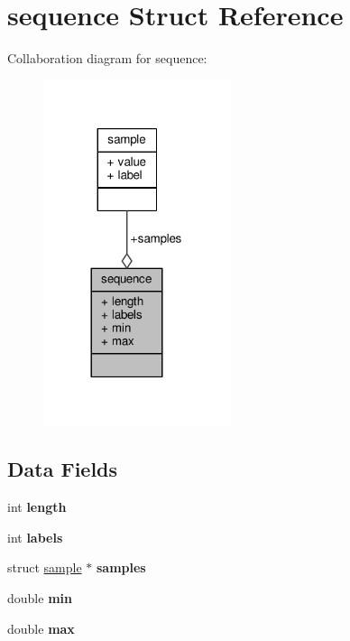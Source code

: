 \hypertarget{structsequence}{}\section{sequence Struct Reference}
\label{structsequence}


Collaboration diagram for sequence\+:\nopagebreak
\begin{figure}[H]
\begin{center}
\leavevmode
\includegraphics[width=156pt]{structsequence__coll__graph}
\end{center}
\end{figure}
\subsection*{Data Fields}
\begin{DoxyCompactItemize}
\item 
\mbox{\label{structsequence_ad17da18a2bb3da07590029e824e20552}} 
int {\bfseries length}
\item 
\mbox{\label{structsequence_a41a7f8a23509c97d200f1bfeb0e80743}} 
int {\bfseries labels}
\item 
\mbox{\label{structsequence_a61d88e23d15a3da29992b8dcf91ac186}} 
struct \hyperlink{structsample}{sample} $\ast$ {\bfseries samples}
\item 
\mbox{\label{structsequence_a2e31642f1ce5e5f9e5070204ee86b55a}} 
double {\bfseries min}
\item 
\mbox{\label{structsequence_acf286fe373173ce1ba2f779dc48a4ad4}} 
double {\bfseries max}
\end{DoxyCompactItemize}


